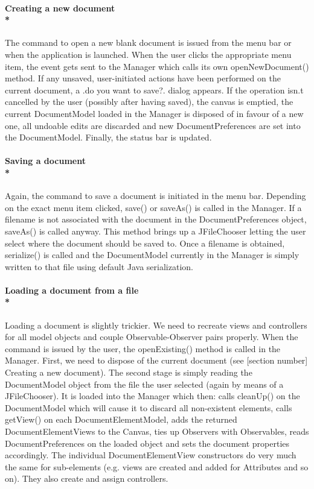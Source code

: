 \paragraph{\small{\tab Creating a new document\\*}}

\hspace{-10pt}The command to open a new blank document is issued from the menu bar or when the application is launched. When the user clicks the appropriate menu item, the event gets sent to the Manager which calls its own openNewDocument() method. If any unsaved, user-initiated actions have been performed on the current document, a .do you want to save?. dialog appears. If the operation isn.t cancelled by the user (possibly after having saved), the canvas is emptied, the current DocumentModel loaded in the Manager is disposed of in favour of a new one, all undoable edits are discarded and new DocumentPreferences are set into the DocumentModel. Finally, the status bar is updated.

\paragraph{\small{\tab Saving a document\\*}}

\hspace{-10pt} Again, the command to save a document is initiated in the menu bar. Depending on the exact menu item clicked, save() or saveAs() is called in the Manager. If a filename is not associated with the document in the DocumentPreferences object, saveAs() is called anyway. This method brings up a JFileChooser letting the user select where the document should be saved to. Once a filename is obtained, serialize() is called and the DocumentModel currently in the Manager is simply written to that file using default Java serialization.

\paragraph{\small{\tab Loading a document from a file\\*}}

\hspace{-10pt} Loading a document is slightly trickier. We need to recreate views and controllers for all model objects and couple Observable-Observer pairs properly. When the command is issued by the user, the openExisting() method is called in the Manager. First, we need to dispose of the current document (see [section number] Creating a new document). The second stage is simply reading the DocumentModel object from the file the user selected (again by means of a JFileChooser). It is loaded into the Manager which then: calls cleanUp() on the DocumentModel which will cause it to discard all non-existent elements, calls getView() on each DocumentElementModel, adds the returned DocumentElementViews to the Canvas, ties up Observers with Observables, reads DocumentPreferences on the loaded object and sets the document properties accordingly. The individual DocumentElementView constructors do very much the same for sub-elements (e.g. views are created and added for Attributes and so on). They also create and assign controllers.

